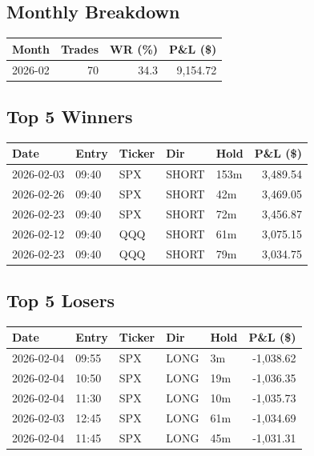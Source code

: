 \documentclass[11pt,a4paper,twoside]{article}
\begin{document}
\subsection{Monthly Breakdown}
\noindent\begin{center}
\begin{tabular}{>{\color{txtmain}}l rrr}
\toprule
\rowcolor{cardbg}
\textbf{Month} & \textbf{Trades} & \textbf{WR (\%)} & \textbf{P\&L (\$)} \\
\midrule
2026-02 & 70 & 34.3 & \textcolor{wingreen}{9,154.72} \\
\bottomrule
\end{tabular}
\end{center}
\subsection{Top 5 Winners}
\noindent\begin{center}
\begin{tabular}{>{\color{txtmain}}l llll r}
\toprule
\rowcolor{cardbg}
\textbf{Date} & \textbf{Entry} & \textbf{Ticker} & \textbf{Dir} & \textbf{Hold} & \textbf{P\&L (\$)} \\
\midrule
2026-02-03 & 09:40 & SPX & SHORT & 153m & \textcolor{wingreen}{3,489.54} \\
2026-02-26 & 09:40 & SPX & SHORT & 42m & \textcolor{wingreen}{3,469.05} \\
2026-02-23 & 09:40 & SPX & SHORT & 72m & \textcolor{wingreen}{3,456.87} \\
2026-02-12 & 09:40 & QQQ & SHORT & 61m & \textcolor{wingreen}{3,075.15} \\
2026-02-23 & 09:40 & QQQ & SHORT & 79m & \textcolor{wingreen}{3,034.75} \\
\bottomrule
\end{tabular}
\end{center}
\subsection{Top 5 Losers}
\noindent\begin{center}
\begin{tabular}{>{\color{txtmain}}l llll r}
\toprule
\rowcolor{cardbg}
\textbf{Date} & \textbf{Entry} & \textbf{Ticker} & \textbf{Dir} & \textbf{Hold} & \textbf{P\&L (\$)} \\
\midrule
2026-02-04 & 09:55 & SPX & LONG & 3m & \textcolor{lossred}{-1,038.62} \\
2026-02-04 & 10:50 & SPX & LONG & 19m & \textcolor{lossred}{-1,036.35} \\
2026-02-04 & 11:30 & SPX & LONG & 10m & \textcolor{lossred}{-1,035.73} \\
2026-02-03 & 12:45 & SPX & LONG & 61m & \textcolor{lossred}{-1,034.69} \\
2026-02-04 & 11:45 & SPX & LONG & 45m & \textcolor{lossred}{-1,031.31} \\
\bottomrule
\end{tabular}
\end{center}
\clearpage
\end{document}
